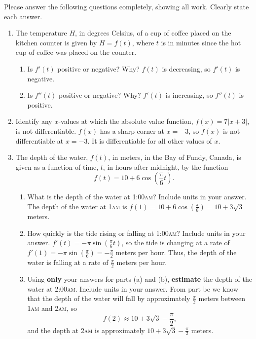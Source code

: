 \documentclass[11pt]{article}
\begin{document}
\drawtitle

\noindent Please answer the following questions completely, showing
all work.  Clearly state each answer.

\begin{enumerate}
\item The temperature $H$, in degrees Celsius, of a cup of coffee
  placed on the kitchen counter is given by $H=f(t)$, where $t$ is in
  minutes since the hot cup of coffee was placed on the counter.
  \begin{enumerate}
  \item Is $f'(t)$ positive or negative? Why?
    \vfill
    {\color{blue}
      $f(t)$ is decreasing, so $f'(t)$ is negative.
    }
    \vfill
  \item Is $f''(t)$ positive or negative? Why?
    \vfill
    {\color{blue}
      $f'(t)$ is increasing, so $f''(t)$ is positive.
    }
    \vfill
  \end{enumerate}

\item Identify any $x$-values at which the absolute value function,
  $f(x)=7|x+3|$, is not differentiable.
  \vfill
  {\color{blue}
  $f(x)$ has a sharp corner at $x=-3$, so $f(x)$ is not differentiable
  at $x=-3$.  It is differentiable for all other values of $x$.}
  \vfill
\newpage

\item The depth of the water, $f(t)$, in meters, in the Bay of Fundy,
  Canada, is given as a function of time, $t$, in hours after
  midnight, by the function
  \[
  f(t)=10+6\cos\left(\frac{\pi}{6}t\right).
  \]
  \begin{enumerate}
  \item What is the depth of the water at 1:00\textsc{am}?
    Include units in your answer.
    \vfill
    {\color{blue}
      The depth of the water at 1\textsc{am} is $f(1) =
      10+6\cos\left(\frac{\pi}{6}\right) = 10+3\sqrt{3}$ meters.
    }
    \vfill
  \item How quickly is the tide rising or falling at 1:00\textsc{am}?  Include
    units in your answer. \vfill
    {\color{blue}
      $f'(t) = -\pi\sin\left(\frac{\pi}{6} t\right)$, so the tide is
      changing at a rate of $f'(1) =
      -\pi\sin\left(\frac{\pi}{6}\right) = -\frac{\pi}{2}$
      meters per hour.  Thus, the depth of the water is falling at a
      rate of $\frac{\pi}{2}$ meters per hour.
    }
    \vfill
  \item Using {\bf only} your answers for parts (a) and (b), {\bf estimate} the depth
    of the water at 2:00\textsc{am}. Include units in your answer.
    \vfill
    {\color{blue}
      From part be we know that the depth of the water will fall by
      approximately $\frac{\pi}{2}$ meters between
      1\textsc{am} and 2\textsc{am}, so
      \[
      f(2) \approx 10+3\sqrt{3} - \frac{\pi}{2},
      \]
      and the depth at 2\textsc{am} is approximately $10+3\sqrt{3} -
      \frac{\pi}{2}$ meters.
    }
    \vfill
    

\end{enumerate}
\end{enumerate}
\end{document}
